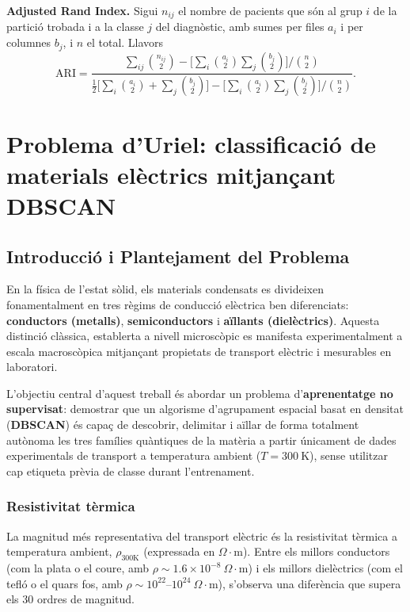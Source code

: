 \documentclass[a4paper,11pt]{article}
\begin{document}
\textbf{Adjusted Rand Index.} Sigui $n_{ij}$ el nombre de pacients que són al grup $i$ de la partició trobada i a la classe $j$ del diagnòstic, amb sumes per files $a_i$ i per columnes $b_j$, i $n$ el total. Llavors
\[
\mathrm{ARI}=\frac{\sum_{ij}\binom{n_{ij}}{2}-\Big[\sum_i\binom{a_i}{2}\sum_j\binom{b_j}{2}\Big]\Big/\binom{n}{2}}
{\tfrac12\Big[\sum_i\binom{a_i}{2}+\sum_j\binom{b_j}{2}\Big]-\Big[\sum_i\binom{a_i}{2}\sum_j\binom{b_j}{2}\Big]\Big/\binom{n}{2}}.
\]

\clearpage
\section{Problema d'Uriel: classificació de materials elèctrics mitjançant DBSCAN}
\label{sec:uriel_materials}
\subsection{Introducció i Plantejament del Problema}

En la física de l'estat sòlid, els materials condensats es divideixen fonamentalment en tres règims de conducció elèctrica ben diferenciats: \textbf{conductors (metalls)}, \textbf{semiconductors} i \textbf{aïllants (dielèctrics)}. Aquesta distinció clàssica, establerta a nivell microscòpic es manifesta experimentalment a escala macroscòpica mitjançant propietats de transport elèctric i mesurables en laboratori.

L'objectiu central d'aquest treball és abordar un problema d'\textbf{aprenentatge no supervisat}: demostrar que un algorisme d'agrupament espacial basat en densitat (\textbf{DBSCAN}) és capaç de descobrir, delimitar i aïllar de forma totalment autònoma les tres famílies quàntiques de la matèria a partir únicament de dades experimentals de transport a temperatura ambient ($T = 300\ \text{K}$), sense utilitzar cap etiqueta prèvia de classe durant l'entrenament.

\subsubsection{Resistivitat tèrmica}

La magnitud més representativa del transport elèctric és la resistivitat tèrmica a temperatura ambient, $\rho_{300\mathrm{K}}$ (expressada en $\Omega\cdot\text{m}$). Entre els millors conductors (com la plata o el coure, amb $\rho \sim 1.6 \times 10^{-8}\ \Omega\cdot\text{m}$) i els millors dielèctrics (com el tefló o el quars fos, amb $\rho \sim 10^{22}$--$10^{24}\ \Omega\cdot\text{m}$), s'observa una diferència que supera els 30 ordres de magnitud.
\end{document}
